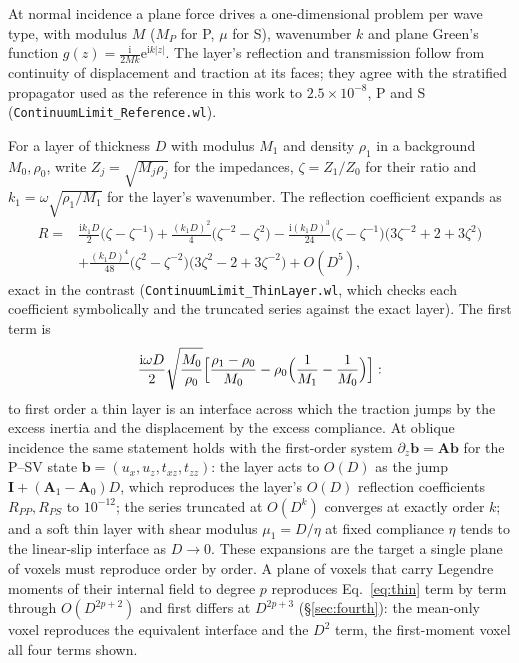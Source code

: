 \documentclass[11pt,a4paper]{article}
\newcommand{\bI}{\mathbf{I}}
\newcommand{\bA}{\mathbf{A}}
\newcommand{\nb}[1]{\texttt{#1}}
\begin{document}
At normal incidence a plane force drives a one-dimensional problem per wave type, with modulus $M$
($M_P$ for P, $\mu$ for S), wavenumber $k$ and plane Green's function
$g(z)=\tfrac{\mathrm{i}}{2Mk}\mathrm{e}^{\mathrm{i}k|z|}$. The layer's reflection and transmission follow from continuity of
displacement and traction at its faces; they agree with the stratified propagator used as the
reference in this work to $2.5\times10^{-8}$, P and S (\nb{ContinuumLimit\_Reference.wl}).

For a layer of thickness $D$ with modulus $M_1$ and density $\rho_1$ in a background $M_0,\rho_0$,
write $Z_j=\sqrt{M_j\rho_j}$ for the impedances, $\zeta=Z_1/Z_0$ for their ratio and
$k_1=\omega\sqrt{\rho_1/M_1}$ for the layer's wavenumber. The reflection coefficient expands as
\begin{equation}\label{eq:thin}
\begin{aligned}
  R={}&\frac{\mathrm{i}k_1D}{2}\bigl(\zeta-\zeta^{-1}\bigr)
  +\frac{(k_1D)^2}{4}\bigl(\zeta^{-2}-\zeta^{2}\bigr)
  -\frac{\mathrm{i}(k_1D)^3}{24}\bigl(\zeta-\zeta^{-1}\bigr)\bigl(3\zeta^{-2}+2+3\zeta^{2}\bigr)\\
  &+\frac{(k_1D)^4}{48}\bigl(\zeta^{2}-\zeta^{-2}\bigr)\bigl(3\zeta^{2}-2+3\zeta^{-2}\bigr)+O(D^5),
\end{aligned}
\end{equation}
exact in the contrast (\nb{ContinuumLimit\_ThinLayer.wl}, which checks each coefficient symbolically
and the truncated series against the exact layer). The first term is
\begin{equation}\label{eq:thin1}
  \frac{\mathrm{i}\omega D}{2}\sqrt{\frac{M_0}{\rho_0}}
  \Bigl[\frac{\rho_1-\rho_0}{M_0}-\rho_0\Bigl(\frac1{M_1}-\frac1{M_0}\Bigr)\Bigr]:
\end{equation}
to first order a thin layer is an
interface across which the traction jumps by the excess inertia and the displacement by the excess
compliance. At oblique incidence the same statement holds with the first-order system
$\partial_z\mathbf b=\bA\mathbf b$ for the P--SV state $\mathbf b=(u_x,u_z,t_{xz},t_{zz})$: the layer
acts to $O(D)$ as the jump $\bI+(\bA_1-\bA_0)D$, which reproduces the layer's $O(D)$ reflection
coefficients $R_{PP},R_{PS}$ to $10^{-12}$; the series truncated at $O(D^k)$ converges at exactly
order $k$; and a soft thin layer with shear modulus $\mu_1=D/\eta$ at fixed compliance $\eta$ tends to
the linear-slip interface as $D\to0$. These expansions are the target a single plane of voxels must
reproduce order by order. A plane of voxels that carry Legendre moments of their internal field to
degree $p$ reproduces Eq.~\eqref{eq:thin} term by term through $O(D^{2p+2})$ and first differs at
$D^{2p+3}$ (\S\ref{sec:fourth}): the mean-only voxel reproduces the equivalent interface and the $D^2$
term, the first-moment voxel all four terms shown.
\end{document}
